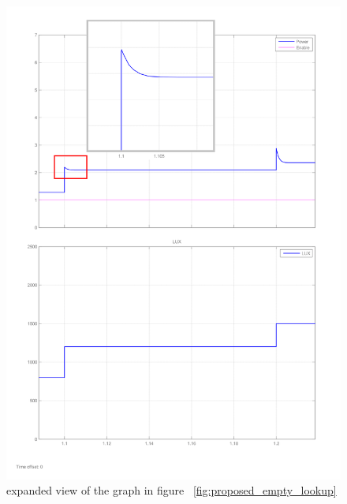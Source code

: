  \begin{figure}[H]
  \begin{center}
  \includegraphics[width=\textwidth]{images/proposed_step_input_zoom-1(2)_pip}
  \caption{ expanded view of the graph in figure ~\ref{fig:proposed_empty_lookup}}
  \label{fig:Zoom_proposed_empty_lookup}
  \end{center}
  \end{figure}

  




